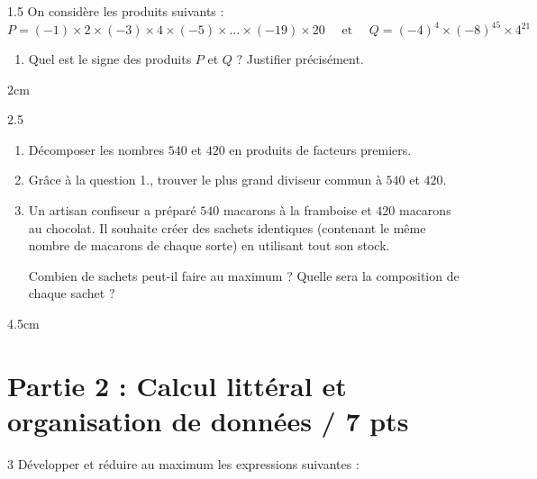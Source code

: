\documentclass[a4paper]{book}
\begin{document}
{    
    \begin{exerciceNote}{1.5}
        On considère les produits suivants : 
        $$P = (-1) \times 2 \times (-3) \times 4 \times (-5) \times \dots \times (-19) \times 20 
        \quad \text{  et  } \quad Q=(-4)^4\times(-8)^{45}\times4^{21}$$
        \begin{enumerate}
            \item Quel est le signe des produits $P$ et $Q$ ? Justifier précisément.
        \end{enumerate}
        
        \begin{ZoneReponse}{2cm}
        \end{ZoneReponse}
    \end{exerciceNote}

    
    \begin{exerciceNote}{2.5}
        \begin{enumerate}
            \item Décomposer les nombres $540$ et $420$ en produits de facteurs premiers.
            \item Grâce à la question 1., trouver le plus grand diviseur commun à $540$ et $420$.
            \item Un artisan confiseur a préparé $540$ macarons à la framboise et $420$ macarons au chocolat. Il souhaite créer des sachets identiques (contenant le même nombre de macarons de chaque sorte) en utilisant tout son stock. 
            
            Combien de sachets peut-il faire au maximum ? Quelle sera la composition de chaque sachet ?
        \end{enumerate}
        
        \begin{ZoneReponse}{4.5cm}
        \end{ZoneReponse}
    \end{exerciceNote}
    
    
\section*{Partie 2 : Calcul littéral et organisation de données \points[2]/ 7 pts }

    \begin{exerciceNote}{3}
        Développer et réduire au maximum les expressions suivantes :
        \medskip
        

\end{exerciceNote}}
\end{document}
